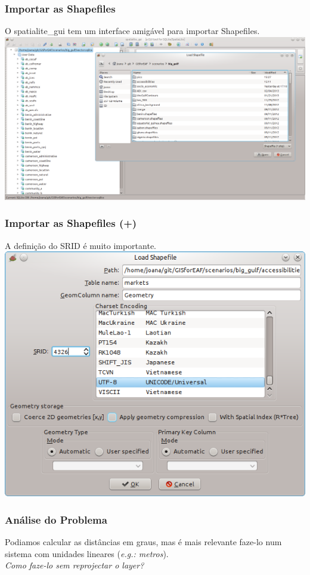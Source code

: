 \documentclass[hyperref={pdfpagelabels=true}]{beamer}
\begin{document}
\begin{frame}
\frametitle{Importar as Shapefiles}
O spatialite\_gui tem um interface amig\'{a}vel para importar Shapefiles.\\
\includegraphics[scale=0.25]{distance2.png}
\end{frame}

\begin{frame}
\frametitle{Importar as Shapefiles (+)}
A defini\c{c}\~{a}o do SRID \'{e} muito importante.\\
\includegraphics[scale=0.4]{distance3.png}
\end{frame}

\begin{frame}
\frametitle{An\'{a}lise do Problema}
Podiamos calcular as dist\^{a}ncias em graus, mas \'{e} mais relevante faze-lo num sistema com unidades lineares (\textit{e.g.: metros}).\\
\vspace{1cm}
\pause
\huge \textit{Como faze-lo sem reprojectar o layer?}
\end{frame}
\end{document}
